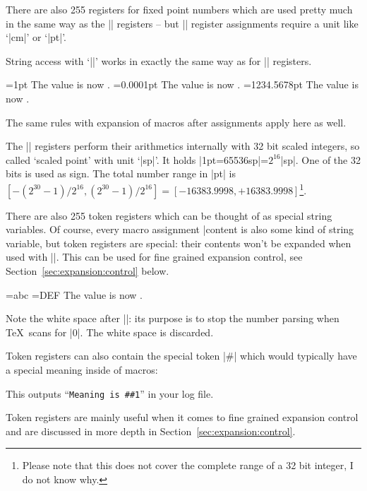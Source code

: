 \documentclass[a4paper,doc2]{ltxdoc}
\begin{document}
\begin{command}{\dimen{}}
	There are also 255 registers for fixed point numbers which are used pretty much in the same way as the |\count| registers -- but |\dimen| register assignments require a unit like `|cm|' or `|pt|'.

	String access with `|\the|' works in exactly the same way as for |\count| registers.
\begin{codeexample}[]
=1pt
The value is now \the{}.
=0.0001pt
The value is now \the{}.
\def\macro{1234.5678}
=\macro pt
The value is now \the{}.
\end{codeexample}
	The same rules with expansion of macros after assignments apply here as well.

	The |\dimen| registers perform their arithmetics internally with 32 bit scaled integers, so called `scaled point' with unit `|sp|'. It holds |1pt=65536sp|=$2^{16}$|sp|. One of the 32 bits is used as sign. The total number range in |pt| is $[-(2^{30}-1)/2^{16}, (2^{30}-1)/2^{16} ] = [-16383.9998,+16383.9998]$\footnote{Please note that this does not cover the complete range of a 32 bit integer, I do not know why.}.
\end{command}

\begin{command}{\toks{}}
\label{cmd:toks}
	There are also 255 token registers which can be thought of as special string variables. Of course, every macro assignment |\def\macro|\marg{content} is also some kind of string variable, but token registers are special: their contents won't be expanded when used with |\the\toks|. This can be used for fine grained expansion control, see Section~\ref{sec:expansion:control} below.

\begin{codeexample}[]
={abc}%
={DEF}%
The value is now \the{} \the{}.
\end{codeexample}
	Note the white space after |\the{}|: its purpose is to stop the number parsing when \TeX\ scans for |0|. The white space is discarded.

	Token registers can also contain the special token |#| which would typically have a special meaning inside of macros:
	This outputs ``\texttt{Meaning is \#\#1}'' in your log file.

	Token registers are mainly useful when it comes to fine grained expansion control and are discussed in more depth in Section~\ref{sec:expansion:control}.
\end{command}
\end{document}
